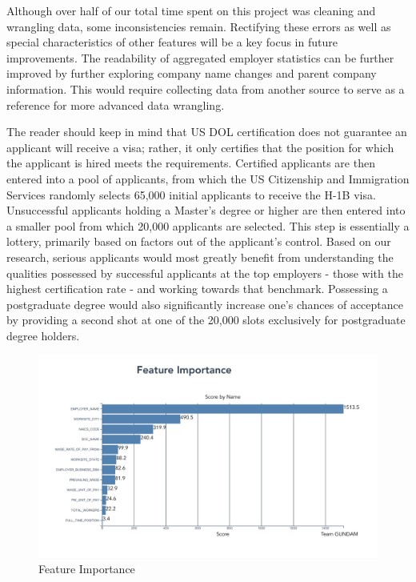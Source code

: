 \documentclass[sigconf]{acmart}
\begin{document}
Although over half of our total time spent on this project 
was cleaning and wrangling data, some inconsistencies remain. Rectifying these errors as well 
as special characteristics of other features will be a key focus in future improvements. 
The readability of aggregated employer statistics can be further improved by further exploring 
company name changes and parent company information. This would require collecting data from another 
source to serve as a reference for more advanced data wrangling. 

The reader should keep in mind that US DOL certification does not guarantee an 
applicant will receive a visa; 
rather, it only certifies that the 
position for which the applicant is hired meets the requirements. 
Certified applicants are then entered into a pool of 
applicants, from which the US Citizenship and Immigration Services randomly 
selects 65,000 initial applicants to receive 
the H-1B visa. Unsuccessful applicants holding a Master's degree or higher are 
then entered into a smaller pool from which 
20,000 applicants are selected. This step is essentially a lottery, 
primarily based on factors out of 
the applicant's control. Based on our research, serious applicants would most 
greatly benefit from understanding the 
qualities possessed by successful applicants at the top employers - those with 
the highest certification rate - and 
working towards that benchmark. Possessing a postgraduate degree would also 
significantly increase one's chances of 
acceptance by providing a second shot at one of the 20,000 slots exclusively 
for postgraduate degree holders. 


\begin{figure}
  \includegraphics[width=\linewidth]{feature_imortance.png}
  \caption{Feature Importance}
  \label{fig:featureimportance}
\end{figure}
\end{document}
